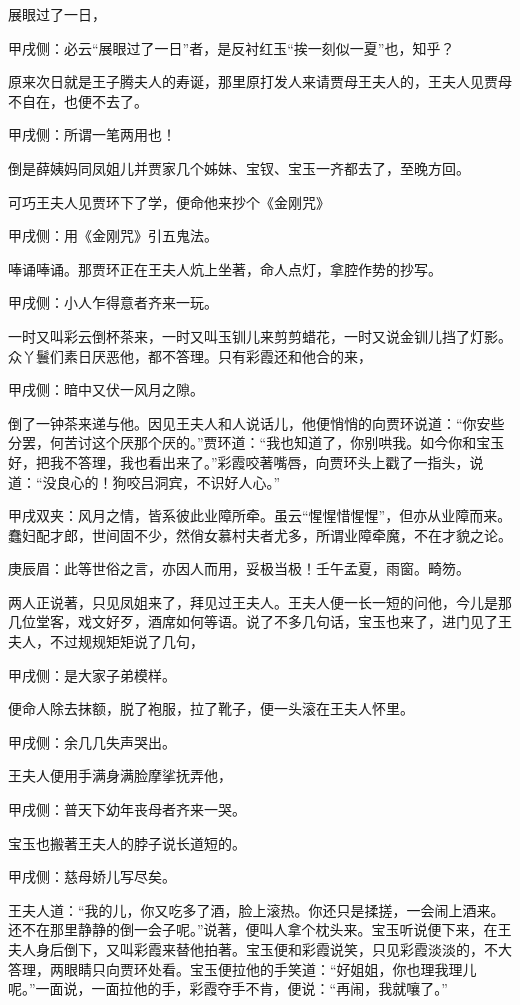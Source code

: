 \begin{parag}
    展眼过了一日，\begin{note}甲戌侧：必云“展眼过了一日”者，是反衬红玉“挨一刻似一夏”也，知乎？\end{note}原来次日就是王子腾夫人的寿诞，那里原打发人来请贾母王夫人的，王夫人见贾母不自在，也便不去了。\begin{note}甲戌侧：所谓一笔两用也！\end{note}倒是薛姨妈同凤姐儿并贾家几个姊妹、宝钗、宝玉一齐都去了，至晚方回。
\end{parag}


\begin{parag}
    可巧王夫人见贾环下了学，便命他来抄个《金刚咒》\begin{note}甲戌侧：用《金刚咒》引五鬼法。\end{note}唪诵唪诵。那贾环正在王夫人炕上坐著，命人点灯，拿腔作势的抄写。\begin{note}甲戌侧：小人乍得意者齐来一玩。\end{note}一时又叫彩云倒杯茶来，一时又叫玉钏儿来剪剪蜡花，一时又说金钏儿挡了灯影。众丫鬟们素日厌恶他，都不答理。只有彩霞还和他合的来，\begin{note}甲戌侧：暗中又伏一风月之隙。\end{note}倒了一钟茶来递与他。因见王夫人和人说话儿，他便悄悄的向贾环说道：“你安些分罢，何苦讨这个厌那个厌的。”贾环道：“我也知道了，你别哄我。如今你和宝玉好，把我不答理，我也看出来了。”彩霞咬著嘴唇，向贾环头上戳了一指头，说道：“没良心的！狗咬吕洞宾，不识好人心。”\begin{note}甲戌双夹：风月之情，皆系彼此业障所牵。虽云“惺惺惜惺惺”，但亦从业障而来。蠢妇配才郎，世间固不少，然俏女慕村夫者尤多，所谓业障牵魔，不在才貌之论。\end{note}\begin{note}庚辰眉：此等世俗之言，亦因人而用，妥极当极！壬午孟夏，雨窗。畸笏。\end{note}
\end{parag}


\begin{parag}
    两人正说著，只见凤姐来了，拜见过王夫人。王夫人便一长一短的问他，今儿是那几位堂客，戏文好歹，酒席如何等语。说了不多几句话，宝玉也来了，进门见了王夫人，不过规规矩矩说了几句，\begin{note}甲戌侧：是大家子弟模样。\end{note}便命人除去抹额，脱了袍服，拉了靴子，便一头滚在王夫人怀里。\begin{note}甲戌侧：余几几失声哭出。\end{note}王夫人便用手满身满脸摩挲抚弄他，\begin{note}甲戌侧：普天下幼年丧母者齐来一哭。\end{note}宝玉也搬著王夫人的脖子说长道短的。\begin{note}甲戌侧：慈母娇儿写尽矣。\end{note}王夫人道：“我的儿，你又吃多了酒，脸上滚热。你还只是揉搓，一会闹上酒来。还不在那里静静的倒一会子呢。”说著，便叫人拿个枕头来。宝玉听说便下来，在王夫人身后倒下，又叫彩霞来替他拍著。宝玉便和彩霞说笑，只见彩霞淡淡的，不大答理，两眼睛只向贾环处看。宝玉便拉他的手笑道：“好姐姐，你也理我理儿呢。”一面说，一面拉他的手，彩霞夺手不肯，便说：“再闹，我就嚷了。”
\end{parag}


